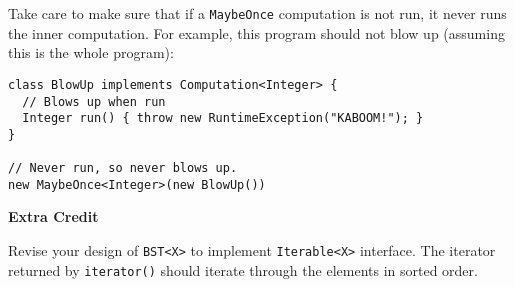 \documentclass[12pt]{article}                   %
\def\pts#1{\marginpar{\footnotesize \raggedright  \fbox{#1 {\sc Points}}}}
\begin{document}
\begin{problem}
Take care to make sure that if a \texttt{MaybeOnce} computation is not
run, it never runs the inner computation.  For example, 
this program should not blow up (assuming this is the whole program):

\begin{verbatim}
class BlowUp implements Computation<Integer> {
  // Blows up when run
  Integer run() { throw new RuntimeException("KABOOM!"); }
}

// Never run, so never blows up.
new MaybeOnce<Integer>(new BlowUp())
\end{verbatim}

\ifrubric
\else
{}
\fi
\newpage
\newpage

\end{problem}

\ifrubric
\else
{}
\fi
\newpage

\begin{problem}  \pts{5}

{\bf Extra Credit}

\noindent
Revise your design of \texttt{BST<X>} to implement
 \texttt{Iterable<X>} interface.  The iterator returned by
 \texttt{iterator()} should iterate through the elements in sorted order.



\end{problem}

\end{document}
